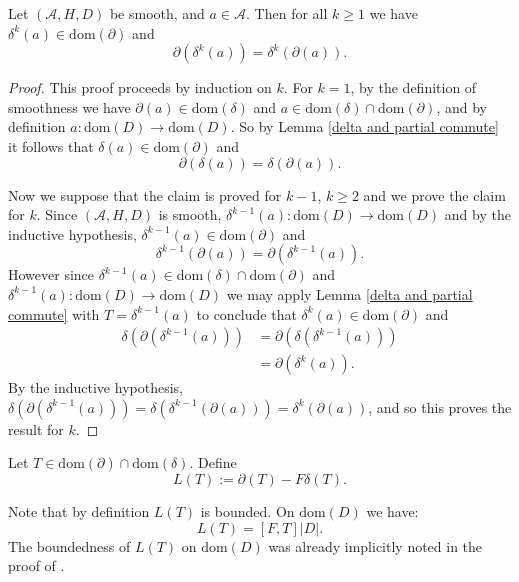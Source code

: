     
    \begin{cor}
        Let $(\mathcal{A},H,D)$ be smooth, and $a \in \mathcal{A}$. Then for all $k\geq 1$ we have $\delta^k(a) \in \mathrm{dom}(\partial)$ and
        \begin{equation*}
            \partial(\delta^k(a)) = \delta^k(\partial(a)).
        \end{equation*}
    \end{cor}
    \begin{proof}
        This proof proceeds by induction on $k$. 
        For $k=1$, by the definition of smoothness we have $\partial(a) \in \mathrm{dom}(\delta)$ and $a \in \mathrm{dom}(\delta)\cap\mathrm{dom}(\partial)$, and by definition $a:\mathrm{dom}(D)\to\mathrm{dom}(D)$. So by Lemma \ref{delta and partial commute} it follows that
        $\delta(a) \in \mathrm{dom}(\partial)$ and 
        \begin{equation*}
            \partial(\delta(a)) = \delta(\partial(a)).
        \end{equation*}
        
        Now we suppose that the claim is proved for $k-1$, $k\geq 2$ and we prove the claim for $k$. Since $(\mathcal{A},H,D)$ is smooth, $\delta^{k-1}(a):\mathrm{dom}(D)\to \mathrm{dom}(D)$ and by the inductive hypothesis, $\delta^{k-1}(a) \in \mathrm{dom}(\partial)$ and
        \begin{equation*}
            \delta^{k-1}(\partial(a)) = \partial(\delta^{k-1}(a)).
        \end{equation*}
        However since $\delta^{k-1}(a) \in \mathrm{dom}(\delta)\cap\mathrm{dom}(\partial)$ and $\delta^{k-1}(a):\mathrm{dom}(D)\to\mathrm{dom}(D)$ we may apply Lemma \ref{delta and partial commute} with $T = \delta^{k-1}(a)$ to conclude
        that $\delta^{k}(a) \in \mathrm{dom}(\partial)$ and
        \begin{align*}
            \delta(\partial(\delta^{k-1}(a))) &= \partial(\delta(\delta^{k-1}(a)))\\
                                              &= \partial(\delta^k(a)).
        \end{align*}
        By the inductive hypothesis, $\delta(\partial(\delta^{k-1}(a))) = \delta(\delta^{k-1}(\partial(a))) = \delta^k(\partial(a))$, and so this proves the result for $k$.
    \end{proof}
    
    
    \begin{defi}
        Let $T \in \mathrm{dom}(\partial)\cap \mathrm{dom}(\delta)$. Define
        \begin{equation*}
            L(T) := \partial(T)-F\delta(T).
        \end{equation*}
    \end{defi}
    Note that by definition $L(T)$ is bounded. On $\mathrm{dom}(D)$ we have:
    \begin{equation*}
        L(T) = [F,T]|D|.
    \end{equation*}
    The boundedness of $L(T)$ on $\mathrm{dom}(D)$ was already implicitly noted in the proof of \cite[Lemma 2]{CPRS1}.
    
